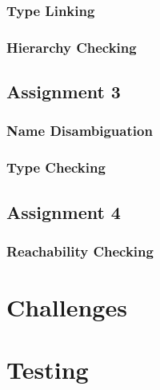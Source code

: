 \documentclass[12pt, titlepage]{article}
\begin{document}
\subsubsection{Type Linking}

\subsubsection{Hierarchy Checking}

\subsection{Assignment 3}
\subsubsection{Name Disambiguation}

\subsubsection{Type Checking}

\subsection{Assignment 4}

\subsubsection{Reachability Checking}

\section{Challenges}

\section{Testing}
\end{document}
